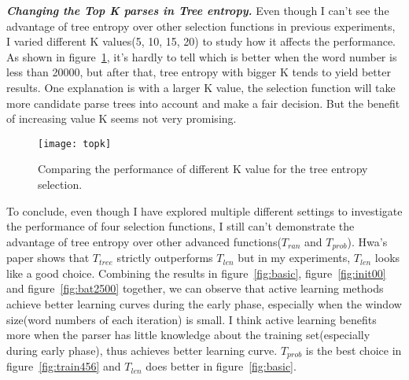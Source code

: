 \documentclass[10pt]{article}
\begin{document}
{\bf \emph{Changing the Top K parses in Tree entropy.}} Even though I can't see the 
advantage of tree entropy over other selection functions in previous experiments, I 
varied different K values(5, 10, 15, 20) to study how it affects the performance.
As shown in figure~\ref{fig:topk}, it's hardly to tell which is better when the word
number is less than 20000, but after that, tree entropy with bigger K tends to yield
better results. One explanation is with a larger K value, the selection function will
take more candidate parse trees into account and make a fair decision. But the benefit of increasing value K seems not very promising.

 \begin{figure}
\centering
\texttt{[image: topk]}
\caption{Comparing the performance of different K value for the tree entropy selection.}\label{fig:topk}
\end{figure}

To conclude, even though I have explored multiple different settings to investigate
the performance of four selection functions, I still can't demonstrate the advantage 
of tree entropy over other advanced functions($T_{ran}$ and $T_{prob}$). 
Hwa's~\cite{hwa} paper shows that $T_{tree}$ strictly outperforms $T_{len}$ but in
my experiments, $T_{len}$ looks like a good choice. Combining the results in 
figure~\ref{fig:basic}, figure~\ref{fig:init00} and figure~\ref{fig:bat2500} 
together, we can observe that active learning methods achieve better learning curves
during the early phase, especially when the window size(word numbers of each iteration)
 is small. I think active learning benefits more when the parser has little knowledge
 about the training set(especially during early phase), thus achieves better learning curve. $T_{prob}$ is the best choice in figure~\ref{fig:train456} and $T_{len}$ 
 does better in figure~\ref{fig:basic}. 



\end{document}
